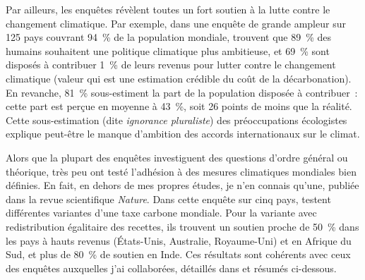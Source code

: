 \documentclass[a5paper,french,openany]{memoir}
\begin{document}
Par ailleurs, les enquêtes révèlent toutes un fort soutien à la lutte contre le changement climatique. Par exemple, dans une enquête de grande ampleur sur 125 pays couvrant 94~\% de la population mondiale, \citet{andre_actual_2024} trouvent que 89~\% des humains souhaitent une politique climatique plus ambitieuse, et 69~\% sont disposés à contribuer 1~\% de leurs revenus pour lutter contre le changement climatique (valeur qui est une estimation crédible du coût de la décarbonation). 
En revanche, 81~\% sous-estiment la part de la population disposée à contribuer~: %
cette part est perçue en moyenne à 43~\%, soit 26 points de moins que la réalité. Cette sous-estimation (dite \textit{ignorance pluraliste}) des préoccupations écologistes explique peut-être le manque d'ambition des accords internationaux sur le climat. %

Alors que la plupart des enquêtes investiguent des questions d'ordre général ou théorique, très peu ont testé l'adhésion à des mesures climatiques mondiales bien définies. En fait, en dehors de mes propres études, je n'en connais qu'une, publiée dans la revue scientifique \textit{Nature}. Dans cette enquête sur cinq pays, \citet{carattini_how_2019} testent différentes variantes d'une taxe carbone mondiale. Pour la variante avec redistribution égalitaire des recettes, ils trouvent un soutien proche de 50~\% dans les pays à hauts revenus (États-Unis, Australie, Royaume-Uni) et en Afrique du Sud, et plus de 80~\% de soutien en Inde. Ces résultats sont cohérents avec ceux des enquêtes auxquelles j'ai collaborées, détaillés dans \citet{fabre_international_2023} et résumés ci-dessous. 
\end{document}
